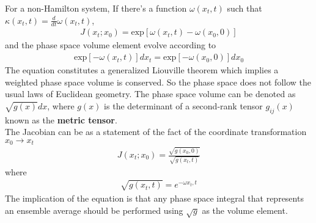 \documentclass{article}
\begin{document}
For a non-Hamilton system, If there's a function $\omega(x_t,t)$ such that $\kappa(x_t,t)=\frac{d}{dt}\omega(x_t,t)$,
\begin{align}
J(x_t;x_0)=\text{exp}[\omega(x_t,t)-\omega(x_0,0)]
\end{align}
and the phase space volume element evolve according to
\begin{align}
\text{exp}[-\omega(x_t,t)]dx_t=\text{exp}[-\omega(x_0,0)]dx_0
\end{align}
The equation constitutes a generalized Liouville theorem which implies a weighted phase space volume is conserved. So the phase space does not follow the usual laws of Euclidean geometry. The phase space volume can be denoted as $\sqrt{g(x)}dx$, where $g(x)$ is the determinant of a second-rank tensor $g_{ij}(x)$ known as the \textbf{metric tensor}.\\
The Jacobian can be as a statement of the fact of the coordinate transformation $x_0\rightarrow x_t$
\begin{align}
J(x_t;x_0)=\frac{\sqrt{g(x_0,0)}}{\sqrt{g(x_t,t)}}
\end{align}
where
\begin{align}
\sqrt{g(x_t,t)}=e^{-\omega{x_t,t}}
\end{align}
The implication of the equation is that any phase space integral that represents an ensemble average should be performed using $\sqrt{g}$ as the volume element.
\end{document}

